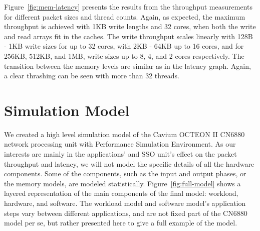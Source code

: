 Figure~\ref{fig:mem-latency} presents the results from the throughput measurements for different packet sizes and thread counts. Again, as expected, the maximum throughput is achieved with 1KB write lengths and 32 cores, when both the write and read arrays fit in the caches. The write throughput scales linearly with 128B - 1KB write sizes for up to 32 cores, with 2KB - 64KB up to 16 cores, and for 256KB, 512KB, and 1MB, write sizes up to 8, 4, and 2 cores respectively. The transition between the memory levels are similar as in the latency graph. Again, a clear thrashing can be seen with more than 32 threads.

\section{Simulation Model}
\label{sec:simulation-model}

We created a high level simulation model of the Cavium OCTEON II CN6880 network processing unit with Performance Simulation Environment. As our interests are mainly in the applications' and SSO unit's  effect on the packet throughput and latency, we will not model the specific details of all the hardware components. Some of the components, such as the input and output phases, or the memory models, are modeled statistically. Figure~\ref{fig:full-model} shows a layered representation of the main components of the final model: workload, hardware, and software. The workload model and software model's application steps vary between different applications, and are not fixed part of the CN6880 model per se, but rather presented here to give a full example of the model.

